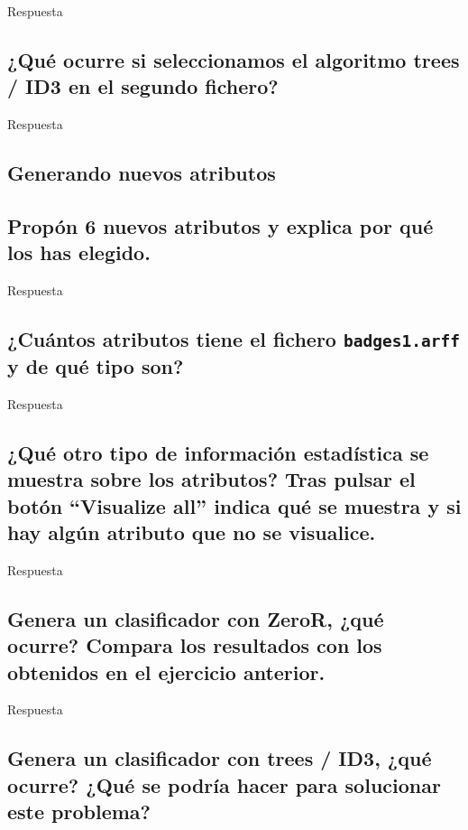 \documentclass[12pt]{article}
\begin{document}
Respuesta

\subsection{¿Qué ocurre si seleccionamos el algoritmo trees / ID3 en el segundo
fichero?}

Respuesta

\newpage

\begin{center}
\section{Generando nuevos atributos}
\end{center}

\subsection{Propón 6 nuevos atributos y explica por qué los has elegido.}

Respuesta

\subsection{¿Cuántos atributos tiene el fichero \texttt{badges1.arff} y de qué tipo
son?}

Respuesta

\subsection{¿Qué otro tipo de información estadística se muestra sobre los
atributos? Tras pulsar el botón ``Visualize all'' indica qué se muestra y si
hay algún atributo que no se visualice.}

Respuesta

\subsection{Genera un clasificador con ZeroR, ¿qué ocurre? Compara los resultados con
los obtenidos en el ejercicio anterior.}

Respuesta

\subsection{Genera un clasificador con trees / ID3, ¿qué ocurre? ¿Qué se podría hacer
para solucionar este problema?}
\end{document}
